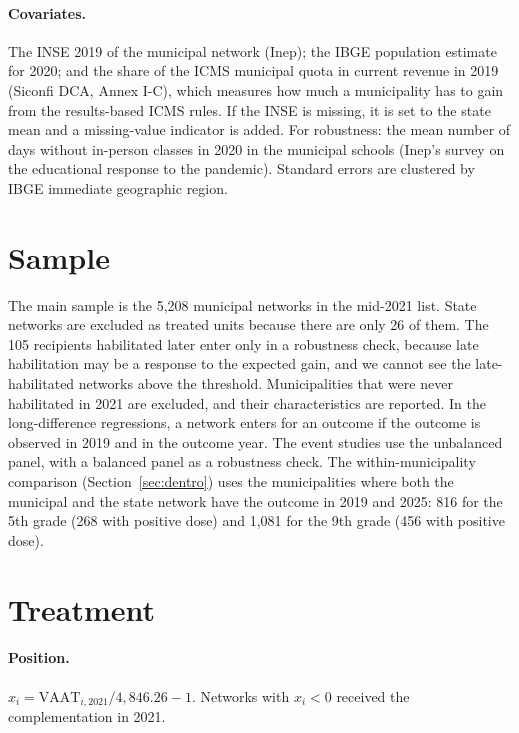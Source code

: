 \documentclass[11pt]{article}
\begin{document}
\paragraph{Covariates.} The INSE 2019 of the municipal network (Inep); the IBGE population estimate for 2020; and the share of the ICMS municipal quota in current revenue in 2019 (Siconfi DCA, Annex I-C), which measures how much a municipality has to gain from the results-based ICMS rules. If the INSE is missing, it is set to the state mean and a missing-value indicator is added. For robustness: the mean number of days without in-person classes in 2020 in the municipal schools (Inep's survey on the educational response to the pandemic). Standard errors are clustered by IBGE immediate geographic region.

\section{Sample}\label{sec:amostra}

The main sample is the 5,208 municipal networks in the mid-2021 list. State networks are excluded as treated units because there are only 26 of them. The 105 recipients habilitated later enter only in a robustness check, because late habilitation may be a response to the expected gain, and we cannot see the late-habilitated networks above the threshold. Municipalities that were never habilitated in 2021 are excluded, and their characteristics are reported. In the long-difference regressions, a network enters for an outcome if the outcome is observed in 2019 and in the outcome year. The event studies use the unbalanced panel, with a balanced panel as a robustness check. The within-municipality comparison (Section~\ref{sec:dentro}) uses the municipalities where both the municipal and the state network have the outcome in 2019 and 2025: 816 for the 5th grade (268 with positive dose) and 1,081 for the 9th grade (456 with positive dose).

\section{Treatment}\label{sec:tratamento}

\paragraph{Position.} $x_i = \text{VAAT}_{i,2021} / 4{,}846.26 - 1$. Networks with $x_i < 0$ received the complementation in 2021.
\end{document}
